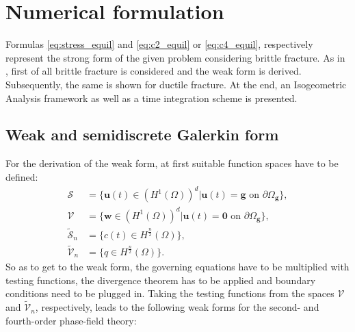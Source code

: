 \section{Numerical formulation} \label{sec:num_formul}
Formulas \eqref{eq:stress_equil} and \eqref{eq:c2_equil} or \eqref{eq:c4_equil}, respectively represent the strong form of the given problem considering brittle fracture. As in , first of all brittle fracture is considered and the weak form is derived. Subsequently, the same is shown for ductile fracture. At the end, an Isogeometric Analysis framework as well as a time integration scheme is presented.

\subsection{Weak and semidiscrete Galerkin form} \label{sec:weak_Gal_form}
For the derivation of the weak form, at first suitable function spaces have to be defined:
\begin{equation} \label{eq:fct_spaces}
	\begin{aligned}
		\bm{\mathcal{S}} &= \{\mathbf{u}\left(t\right)\in\left(H^{1}\left(\Omega\right)\right)^{d}|\mathbf{u}\left(t\right)=\mathbf{g} \text{ on }\partial\Omega_{\mathbf{g}}\}, \\
		\bm{\mathcal{V}} &= \{\mathbf{w}\in\left(H^{1}\left(\Omega\right)\right)^{d}|\mathbf{u}\left(t\right)=\mathbf{0} \text{ on }\partial\Omega_{\mathbf{g}}\}, \\		
		\tilde{\mathcal{S}}_{n} &= \{c\left(t\right)\in H^{\frac{n}{2}}\left(\Omega\right)\}, \\
		\tilde{\mathcal{V}}_{n} &= \{q\in H^{\frac{n}{2}}\left(\Omega\right)\}.
	\end{aligned}
\end{equation}
So as to get to the weak form, the governing equations have to be multiplied with testing functions, the divergence theorem has to be applied and boundary conditions need to be plugged in. Taking the testing functions from the spaces $\mathbf{\mathcal{V}}$ and $\tilde{\mathcal{V}}_{n}$, respectively, leads to the following weak forms for the second- and fourth-order phase-field theory:

